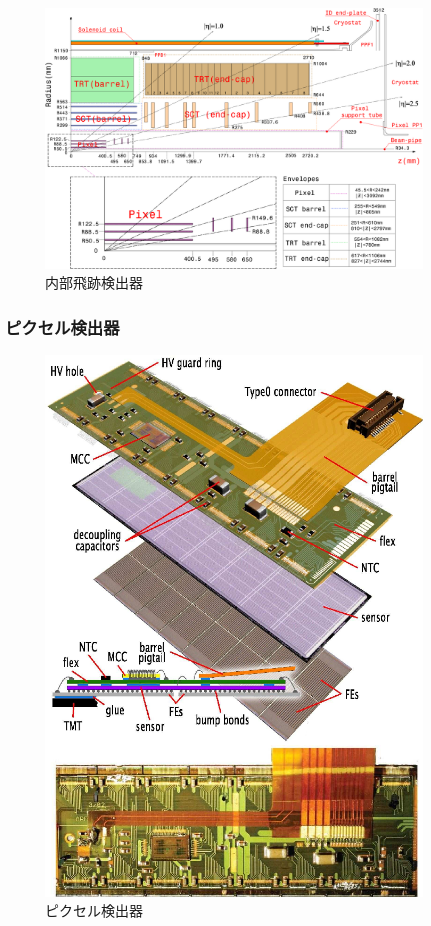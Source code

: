 \begin{figure}[bpt]\centering
\includegraphics[width=10cm]{inner_cross_section}
\caption[内部飛跡検出器]{内部飛跡検出器\cite{1-2}}
\label{inner_cross_section}
\end{figure}

\subsubsection{ピクセル検出器}

\begin{figure}[bpt]\centering
\includegraphics[width=10cm]{pixel_detector}
\caption[ピクセル検出器]{ピクセル検出器\cite{1-2}}
\label{inner_detector}
\end{figure}

